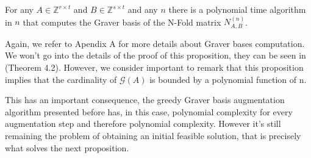 \begin{proposition}
For any $A \in \mathbb{Z}^{r \times t}$ and $B \in \mathbb{Z}^{s \times t}$ and any $n$ there is a polynomial time algorithm in $n$ that computes the Graver basis of the N-Fold matrix $N_{A,B}^{(n)}$. 
\end{proposition}
\vspace{-10pt}

Again, we refer to Apendix A for more details about Graver bases computation. We won't go into the details of the proof of this proposition, they can be seen in \cite{LHOW:2006} (Theorem 4.2). However, we consider important to remark that this proposition implies that the cardinality of $\mathcal{G}(A)$ is bounded by a polynomial function of n.

This has an important consequence, the greedy Graver basis augmentation algorithm presented before has, in this case, polynomial complexity for every augmentation step and therefore polynomial complexity. However it's still remaining the problem of obtaining an initial feasible solution, that is precisely what solves the next proposition.


